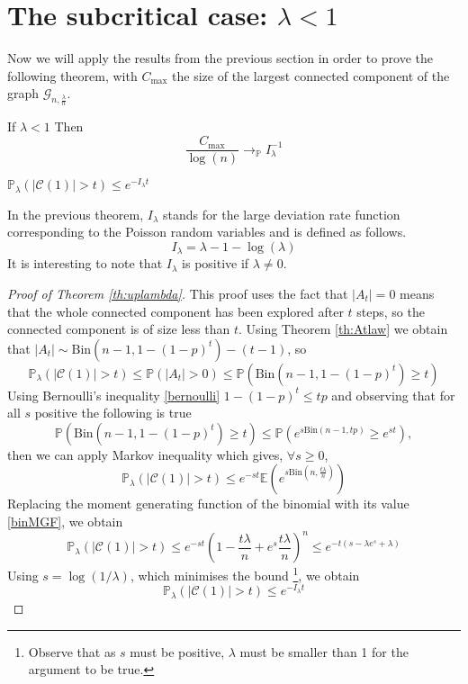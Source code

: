 \section{The subcritical case: $\lambda < 1$}
Now we will apply the results from the previous section in order to prove the following theorem, with $C_{\max}$ the size of the largest connected component of the graph $\mathcal{G}_{n, \frac{\lambda}{n}}$.
\begin{theorem}\label{th:subCritCV}
	If $\lambda < 1$
	\newline
	Then
	\begin{equation}
		\frac{C_{\max}}{\log(n)} \longrightarrow_\mathbb{P} I_{\lambda}^{-1}
	\end{equation}
\end{theorem}
\begin{theorem}\label{th:uplambda}
	$\mathbb{P}_{\lambda}(|\mathcal{C}(1)| >t) \leq e^{-I_{\lambda}t}$
\end{theorem}
In the previous theorem, $I_{\lambda}$ stands for the large deviation rate function corresponding to the Poisson random variables and is defined as follows.
\begin{equation}
	I_{\lambda} = \lambda - 1 - \log(\lambda)
\end{equation}
It is interesting to note that $I_\lambda$ is positive if $\lambda \neq 0$.
\begin{proof}[Proof of Theorem \ref{th:uplambda}]
	This proof uses the fact that $|A_t| = 0$ means that the whole connected component has been explored after $t$ steps, so the connected component is of size less than $t$.
	Using Theorem \ref{th:Atlaw} we obtain that $|A_t| \sim \text{Bin}(n-1, 1-(1-p)^t) - (t-1)$, so 
	\begin{equation}
		\mathbb{P}_{\lambda}(|\mathcal{C}(1)| > t ) \leq \mathbb{P}(|A_t|>0) \leq \mathbb{P}(\text{Bin}(n-1, 1-(1-p)^t) \geq t)
	\end{equation}
	Using Bernoulli's inequality \eqref{bernoulli} $ 1- (1-p)^t \leq tp$ and observing that for all $s$ positive the following is true
	\begin{equation}
		\mathbb{P}(\text{Bin}(n-1, 1-(1-p)^t) \geq t) \leq \mathbb{P}(e^{s\text{Bin}(n-1, tp)} \geq e^{st}),
	\end{equation}
	then we can apply Markov inequality which gives, $\forall s \geq 0$, 
	\begin{equation}
		\mathbb{P}_{\lambda}(|\mathcal{C}(1)| > t ) \leq e^{-st}\mathbb{E}(e^{s\text{Bin}(n, \frac{t\lambda}{n})})
	\end{equation}
	Replacing the moment generating function of the binomial with its value \eqref{binMGF}, we obtain 
	\begin{equation}
		\mathbb{P}_{\lambda}(|\mathcal{C}(1)| > t ) \leq e^{-st}(1 - \frac{t\lambda}{n} + e^s\frac{t\lambda}{n})^n \leq e^{-t(s - \lambda e^s + \lambda)}
	\end{equation}
	Using $s=\log(1/\lambda)$, which minimises the bound \footnote{ Observe that as $s$ must be positive, $\lambda$ must be smaller than 1 for the argument to be true.}, we obtain
	\begin{equation}
		\mathbb{P}_{\lambda}(|\mathcal{C}(1)| >t) \leq e^{-I_{\lambda}t}
	\end{equation}
\end{proof}
